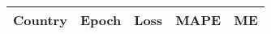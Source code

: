 \begin{tabular}{lllll}
\toprule
Country & Epoch & Loss & MAPE & ME \\
\midrule
\bottomrule
\end{tabular}

